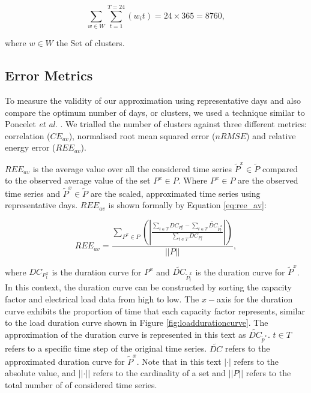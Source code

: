 \begin{equation}
\label{elecsim:eq:total_scale}
\sum\limits_{w\in W}\sum\limits_{t=1}^{T=24}\left(w_i t\right)=24\times 365=8760,
\end{equation}

\noindent where $w\in W$ the Set of clusters.

\subsection{Error Metrics}

To measure the validity of our approximation using representative days and also compare the optimum number of days, or clusters, we used a technique similar to Poncelet \textit{et al.} \cite{Dhaeseleer2015, Poncelet2017}. We trialled the number of clusters against three different metrics: correlation ($CE_{av}$), normalised root mean squared error ($nRMSE$) and relative energy error ($REE_{av}$). 

$REE_{av}$ is the average value over all the considered time series $\widetilde{P}^x{\in} \widetilde{P}$ compared to the observed average value of the set $P^x\in P$. Where $P^x\in P$ are the observed time series and $\widetilde{P}^x{\in} \widetilde{P}$ are the scaled, approximated time series using representative days. $REE_{av}$ is shown formally by Equation \ref{eq:ree_av}:


\begin{equation}
\label{eq:ree_av}
REE_{av}=\frac
{\sum\limits_{P^x{\in} P}\left(\left|
	\frac
	{\sum\limits_{t\in T}DC_{P^x_t}-\sum\limits_{t\in T}\widetilde{DC}_{\widetilde{P}^x_t}}
	{\sum\limits_{t\in T}DC_{P^x_t}}
	\right|\right)
}
{\left|\left|P\right|\right|},
\end{equation}

\noindent where $DC_{P^x_t}$ is the duration curve for $P^x$ and $\widetilde{DC}_{\widetilde{P}^x_t}$ is the duration curve for $\widetilde{P}^x$. In this context, the duration curve can be constructed by sorting the capacity factor and electrical load data from high to low. The $x-$axis for the duration curve exhibits the proportion of time that each capacity factor represents, similar to the load duration curve shown in Figure \ref{fig:loaddurationcurve}. The approximation of the duration curve is represented in this text as $\widetilde{DC}_{\widetilde{p}^x}$. $t\in T$ refers to a specific time step of the original time series. $\widetilde{DC}$ refers to the approximated duration curve for $\widetilde{P}^x$. Note that in this text $\left|\cdot\right|$ refers to the absolute value, and $\left|\left|\cdot\right|\right|$ refers to the cardinality of a set and $\left|\left|P\right|\right|$ refers to the total number of of considered time series.

